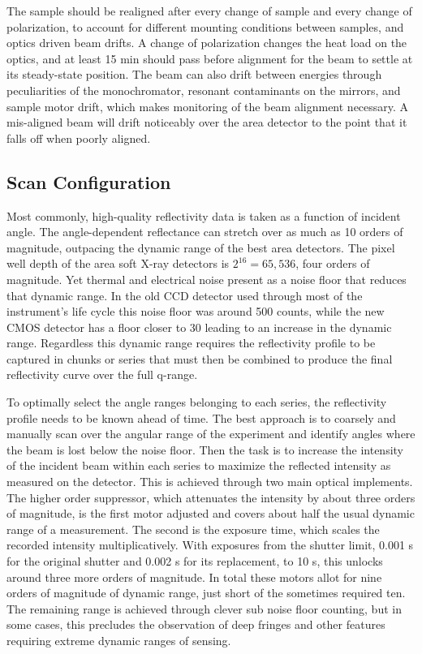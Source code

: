 The sample should be realigned after every change of sample and every change of polarization, to account for different mounting conditions between samples, and optics driven beam drifts. A change of polarization changes the heat load on the optics, and at least 15 min should pass before alignment for the beam to settle at its steady-state position. The beam can also drift between energies through peculiarities of the monochromator, resonant contaminants on the mirrors, and sample motor drift, which makes monitoring of the beam alignment necessary. A mis-aligned beam will drift noticeably over the area detector to the point that it falls off when poorly aligned.

\subsection{Scan Configuration}\label{sec:scan-configuration}

Most commonly, high-quality reflectivity data is taken as a function of incident angle. The angle-dependent reflectance can stretch over as much as 10 orders of magnitude, outpacing the dynamic range of the best area detectors. The pixel well depth of the area soft X-ray detectors is \(2^{16} = 65,536\), four orders of magnitude. Yet thermal and electrical noise present as a noise floor that reduces that dynamic range. In the old CCD detector used through most of the instrument's life cycle this noise floor was around 500 counts, while the new CMOS detector has a floor closer to 30 leading to an increase in the dynamic range. Regardless this dynamic range requires the reflectivity profile to be captured in chunks or series that must then be combined to produce the final reflectivity curve over the full q-range.

To optimally select the angle ranges belonging to each series, the reflectivity profile needs to be known ahead of time. The best approach is to coarsely and manually scan over the angular range of the experiment and identify angles where the beam is lost below the noise floor. Then the task is to increase the intensity of the incident beam within each series to maximize the reflected intensity as measured on the detector. This is achieved through two main optical implements. The higher order suppressor, which attenuates the intensity by about three orders of magnitude, is the first motor adjusted and covers about half the usual dynamic range of a measurement. The second is the exposure time, which scales the recorded intensity multiplicatively. With exposures from the shutter limit, 0.001 s for the original shutter and 0.002 s for its replacement, to 10 s, this unlocks around three more orders of magnitude. In total these motors allot for nine orders of magnitude of dynamic range, just short of the sometimes required ten. The remaining range is achieved through clever sub noise floor counting, but in some cases, this precludes the observation of deep fringes and other features requiring extreme dynamic ranges of sensing.

